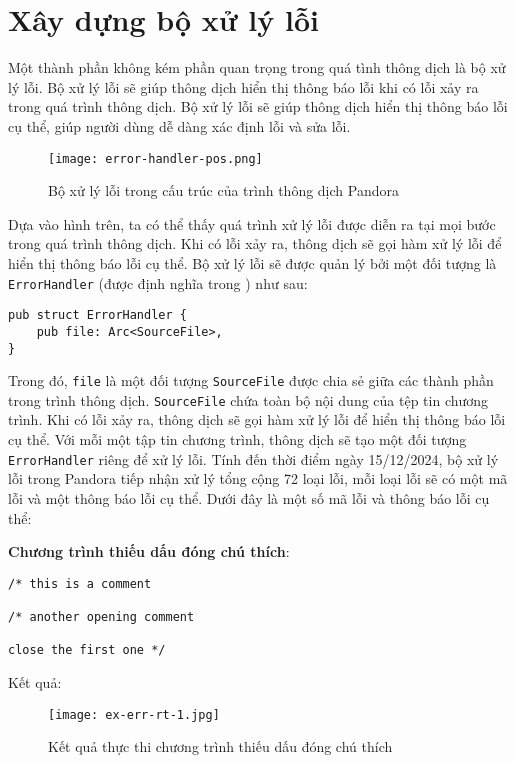\section{Xây dựng bộ xử lý lỗi}
\label{ch3:err-handler}

    Một thành phần không kém phần quan trọng trong quá tình thông dịch là bộ xử lý lỗi. Bộ xử lý lỗi sẽ giúp thông dịch hiển thị thông báo lỗi khi có lỗi xảy ra trong quá trình thông dịch. Bộ xử lý lỗi sẽ giúp thông dịch hiển thị thông báo lỗi cụ thể, giúp người dùng dễ dàng xác định lỗi và sửa lỗi.

\begin{figure}[H]
    \centering
    \texttt{[image: error-handler-pos.png]}
    \caption{Bộ xử lý lỗi trong cấu trúc của trình thông dịch Pandora}
\end{figure}

Dựa vào hình trên, ta có thể thấy quá trình xử lý lỗi được diễn ra tại mọi bước trong quá trình thông dịch. Khi có lỗi xảy ra, thông dịch sẽ gọi hàm xử lý lỗi để hiển thị thông báo lỗi cụ thể. Bộ xử lý lỗi sẽ được quản lý bởi một đối tượng là \texttt{ErrorHandler} (được định nghĩa trong ) như sau:

\begin{lstlisting}[]
pub struct ErrorHandler {
    pub file: Arc<SourceFile>,
}
\end{lstlisting}

Trong đó, \texttt{file} là một đối tượng \texttt{SourceFile} được chia sẻ giữa các thành phần trong trình thông dịch. \texttt{SourceFile} chứa toàn bộ nội dung của tệp tin chương trình. Khi có lỗi xảy ra, thông dịch sẽ gọi hàm xử lý lỗi để hiển thị thông báo lỗi cụ thể. Với mỗi một tập tin chương trình, thông dịch sẽ tạo một đối tượng \texttt{ErrorHandler} riêng để xử lý lỗi. Tính đến thời điểm ngày 15/12/2024, bộ xử lý lỗi trong Pandora tiếp nhận xử lý tổng cộng 72 loại lỗi, mỗi loại lỗi sẽ có một mã lỗi và một thông báo lỗi cụ thể. Dưới đây là một số mã lỗi và thông báo lỗi cụ thể:

\noindent \textbf{Chương trình thiếu dấu đóng chú thích}:

\begin{lstlisting}[]
/* this is a comment

/* another opening comment

close the first one */
\end{lstlisting}

\noindent Kết quả:
\begin{figure}[H]
    \centering
    \texttt{[image: ex-err-rt-1.jpg]}
    \caption{Kết quả thực thi chương trình thiếu dấu đóng chú thích}
\end{figure}

